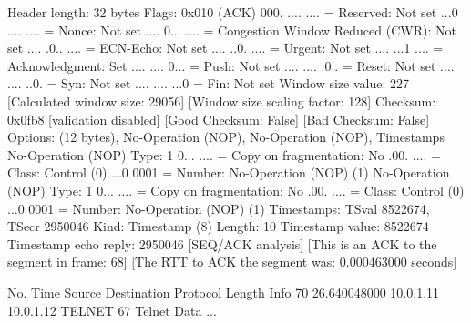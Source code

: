     Header length: 32 bytes
    Flags: 0x010 (ACK)
        000. .... .... = Reserved: Not set
        ...0 .... .... = Nonce: Not set
        .... 0... .... = Congestion Window Reduced (CWR): Not set
        .... .0.. .... = ECN-Echo: Not set
        .... ..0. .... = Urgent: Not set
        .... ...1 .... = Acknowledgment: Set
        .... .... 0... = Push: Not set
        .... .... .0.. = Reset: Not set
        .... .... ..0. = Syn: Not set
        .... .... ...0 = Fin: Not set
    Window size value: 227
    [Calculated window size: 29056]
    [Window size scaling factor: 128]
    Checksum: 0x0fb8 [validation disabled]
        [Good Checksum: False]
        [Bad Checksum: False]
    Options: (12 bytes), No-Operation (NOP), No-Operation (NOP), Timestamps
        No-Operation (NOP)
            Type: 1
                0... .... = Copy on fragmentation: No
                .00. .... = Class: Control (0)
                ...0 0001 = Number: No-Operation (NOP) (1)
        No-Operation (NOP)
            Type: 1
                0... .... = Copy on fragmentation: No
                .00. .... = Class: Control (0)
                ...0 0001 = Number: No-Operation (NOP) (1)
        Timestamps: TSval 8522674, TSecr 2950046
            Kind: Timestamp (8)
            Length: 10
            Timestamp value: 8522674
            Timestamp echo reply: 2950046
    [SEQ/ACK analysis]
        [This is an ACK to the segment in frame: 68]
        [The RTT to ACK the segment was: 0.000463000 seconds]

No.     Time           Source                Destination           Protocol Length Info
     70 26.640048000   10.0.1.11             10.0.1.12             TELNET   67     Telnet Data ...

